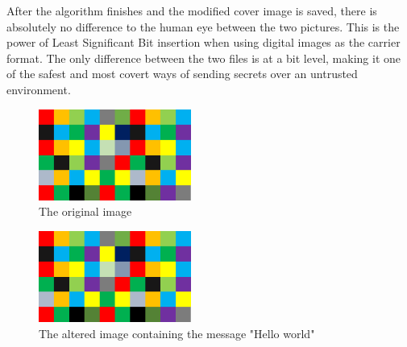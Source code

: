 \begin{multicols*}{2}
After the algorithm finishes and the modified cover image is saved, there is absolutely no difference to the human eye between the two pictures. This is the power of Least Significant Bit insertion when using digital images as the carrier format. The only difference between the two files is at a bit level, making it one of the safest and most covert ways of sending secrets over an untrusted environment.

\begin{figure}[H]
    \centering
    \includegraphics[width=5cm,keepaspectratio]{pics/bmp_scrambling/original_image}
    \caption{The original image}
\end{figure}

\begin{figure}[H]
    \centering
    \includegraphics[width=5cm,keepaspectratio]{pics/bmp_scrambling/altered_image}
    \caption{The altered image containing the message "Hello world"}
\end{figure}


\end{multicols*}
